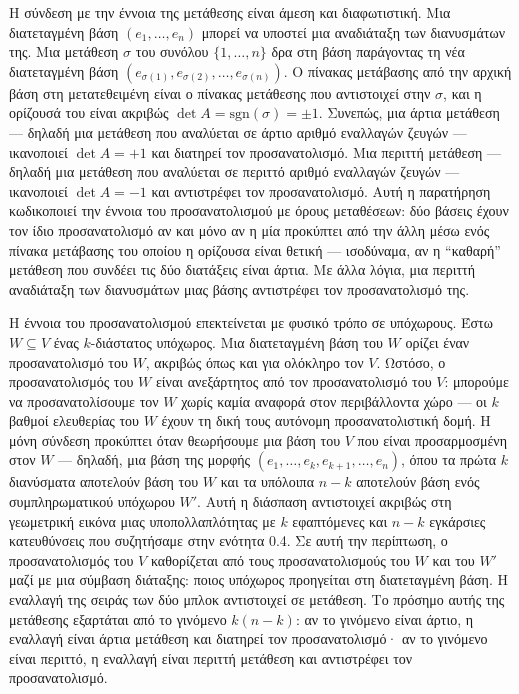 \documentclass[12pt]{article}
\begin{document}
Η σύνδεση με την έννοια της μετάθεσης είναι άμεση και διαφωτιστική. Μια διατεταγμένη βάση $(e_1, \dots, e_n)$ μπορεί να υποστεί μια αναδιάταξη των διανυσμάτων της. Μια μετάθεση $\sigma$ του συνόλου $\{1, \dots, n\}$ δρα στη βάση παράγοντας τη νέα διατεταγμένη βάση $(e_{\sigma(1)}, e_{\sigma(2)}, \dots, e_{\sigma(n)})$. Ο πίνακας μετάβασης από την αρχική βάση στη μετατεθειμένη είναι ο πίνακας μετάθεσης που αντιστοιχεί στην $\sigma$, και η ορίζουσά του είναι ακριβώς $\det A = \text{sgn}(\sigma) = \pm 1$. Συνεπώς, μια άρτια μετάθεση --- δηλαδή μια μετάθεση που αναλύεται σε άρτιο αριθμό εναλλαγών ζευγών --- ικανοποιεί $\det A = +1$ και διατηρεί τον προσανατολισμό. Μια περιττή μετάθεση --- δηλαδή μια μετάθεση που αναλύεται σε περιττό αριθμό εναλλαγών ζευγών --- ικανοποιεί $\det A = -1$ και αντιστρέφει τον προσανατολισμό. Αυτή η παρατήρηση κωδικοποιεί την έννοια του προσανατολισμού με όρους μεταθέσεων: δύο βάσεις έχουν τον ίδιο προσανατολισμό αν και μόνο αν η μία προκύπτει από την άλλη μέσω ενός πίνακα μετάβασης του οποίου η ορίζουσα είναι θετική --- ισοδύναμα, αν η ``καθαρή'' μετάθεση που συνδέει τις δύο διατάξεις είναι άρτια. Με άλλα λόγια, μια περιττή αναδιάταξη των διανυσμάτων μιας βάσης αντιστρέφει τον προσανατολισμό της.

Η έννοια του προσανατολισμού επεκτείνεται με φυσικό τρόπο σε υπόχωρους. Έστω $W \subseteq V$ ένας $k$-διάστατος υπόχωρος. Μια διατεταγμένη βάση του $W$ ορίζει έναν προσανατολισμό του $W$, ακριβώς όπως και για ολόκληρο τον $V$. Ωστόσο, ο προσανατολισμός του $W$ είναι ανεξάρτητος από τον προσανατολισμό του $V$: μπορούμε να προσανατολίσουμε τον $W$ χωρίς καμία αναφορά στον περιβάλλοντα χώρο --- οι $k$ βαθμοί ελευθερίας του $W$ έχουν τη δική τους αυτόνομη προσανατολιστική δομή. Η μόνη σύνδεση προκύπτει όταν θεωρήσουμε μια βάση του $V$ που είναι προσαρμοσμένη στον $W$ --- δηλαδή, μια βάση της μορφής $(e_1, \dots, e_k, e_{k+1}, \dots, e_n)$, όπου τα πρώτα $k$ διανύσματα αποτελούν βάση του $W$ και τα υπόλοιπα $n-k$ αποτελούν βάση ενός συμπληρωματικού υπόχωρου $W'$. Αυτή η διάσπαση αντιστοιχεί ακριβώς στη γεωμετρική εικόνα μιας υποπολλαπλότητας με $k$ εφαπτόμενες και $n-k$ εγκάρσιες κατευθύνσεις που συζητήσαμε στην ενότητα 0.4. Σε αυτή την περίπτωση, ο προσανατολισμός του $V$ καθορίζεται από τους προσανατολισμούς του $W$ και του $W'$ μαζί με μια σύμβαση διάταξης: ποιος υπόχωρος προηγείται στη διατεταγμένη βάση. Η εναλλαγή της σειράς των δύο μπλοκ αντιστοιχεί σε μετάθεση. Το πρόσημο αυτής της μετάθεσης εξαρτάται από το γινόμενο $k(n-k)$: αν το γινόμενο είναι άρτιο, η εναλλαγή είναι άρτια μετάθεση και διατηρεί τον προσανατολισμό· αν το γινόμενο είναι περιττό, η εναλλαγή είναι περιττή μετάθεση και αντιστρέφει τον προσανατολισμό.
\end{document}

